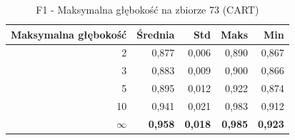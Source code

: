 \begin{table}[htbp]
\centering
\small
\setlength{\tabcolsep}{6pt}
\renewcommand{\arraystretch}{1.2}
\caption{F1 - Maksymalna głębokość na zbiorze 73 (CART)}
\label{tab:CART_max_depth_73_f1}
\begin{tabular}{r|r|r|r|r}
\toprule
Maksymalna głębokość & Średnia & Std & Maks & Min \\
\hline
2 & 0,877 & 0,006 & 0,890 & 0,867 \\
3 & 0,883 & 0,009 & 0,900 & 0,866 \\
5 & 0,895 & 0,012 & 0,922 & 0,874 \\
10 & 0,941 & 0,021 & 0,983 & 0,912 \\
\textbf{$\infty$} & \textbf{0,958} & \textbf{0,018} & \textbf{0,985} & \textbf{0,923} \\
\bottomrule
\end{tabular}
\end{table}
